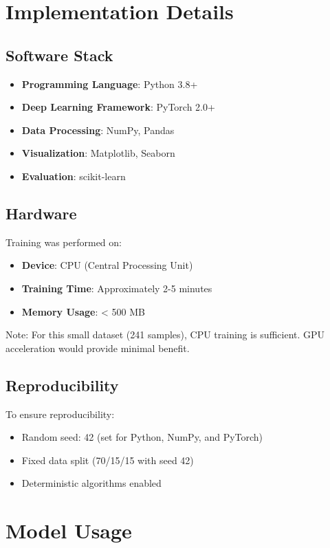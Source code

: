 \documentclass[12pt,a4paper]{article}
\begin{document}
\section{Implementation Details}

\subsection{Software Stack}

\begin{itemize}
    \item \textbf{Programming Language}: Python 3.8+
    \item \textbf{Deep Learning Framework}: PyTorch 2.0+
    \item \textbf{Data Processing}: NumPy, Pandas
    \item \textbf{Visualization}: Matplotlib, Seaborn
    \item \textbf{Evaluation}: scikit-learn
\end{itemize}

\subsection{Hardware}

Training was performed on:
\begin{itemize}
    \item \textbf{Device}: CPU (Central Processing Unit)
    \item \textbf{Training Time}: Approximately 2-5 minutes
    \item \textbf{Memory Usage}: < 500 MB
\end{itemize}

Note: For this small dataset (241 samples), CPU training is sufficient. GPU acceleration would provide minimal benefit.

\subsection{Reproducibility}

To ensure reproducibility:
\begin{itemize}
    \item Random seed: 42 (set for Python, NumPy, and PyTorch)
    \item Fixed data split (70/15/15 with seed 42)
    \item Deterministic algorithms enabled
\end{itemize}

\section{Model Usage}
\end{document}
